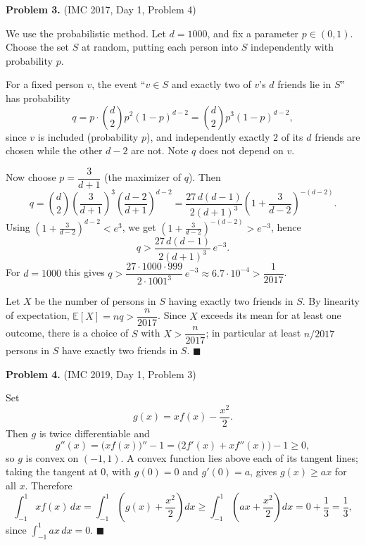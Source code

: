 \documentclass{article}
\newcommand{\E}{\mathbb{E}}
\begin{document}
\bigskip

\noindent\textbf{Problem 3.} (IMC 2017, Day 1, Problem 4)

\medskip
\noindent We use the probabilistic method. Let \( d = 1000 \), and fix a parameter \( p \in (0,1) \). Choose the set \( S \) at random, putting each person into \( S \) independently with probability \( p \).

For a fixed person \( v \), the event ``\( v \in S \) and exactly two of \( v \)'s \( d \) friends lie in \( S \)'' has probability
\[
q = p \cdot \binom{d}{2} p^2 (1-p)^{d-2} = \binom{d}{2} p^3 (1-p)^{d-2},
\]
since \( v \) is included (probability \( p \)), and independently exactly \( 2 \) of its \( d \) friends are chosen while the other \( d-2 \) are not. Note \( q \) does not depend on \( v \).

Now choose \( p = \dfrac{3}{d+1} \) (the maximizer of \( q \)). Then
\[
q = \binom{d}{2}\left(\frac{3}{d+1}\right)^{3}\left(\frac{d-2}{d+1}\right)^{d-2}
= \frac{27\,d(d-1)}{2(d+1)^3}\left(1 + \frac{3}{d-2}\right)^{-(d-2)}.
\]
Using \( \left(1 + \tfrac{3}{d-2}\right)^{d-2} < e^{3} \), we get \( \left(1 + \tfrac{3}{d-2}\right)^{-(d-2)} > e^{-3} \), hence
\[
q > \frac{27\,d(d-1)}{2(d+1)^3}\, e^{-3}.
\]
For \( d = 1000 \) this gives \( q > \dfrac{27\cdot 1000 \cdot 999}{2\cdot 1001^3}\, e^{-3} \approx 6.7\cdot 10^{-4} > \dfrac{1}{2017} \).

Let \( X \) be the number of persons in \( S \) having exactly two friends in \( S \). By linearity of expectation, \( \E[X] = n q > \dfrac{n}{2017} \). Since \( X \) exceeds its mean for at least one outcome, there is a choice of \( S \) with \( X > \dfrac{n}{2017} \); in particular at least \( n/2017 \) persons in \( S \) have exactly two friends in \( S \). \hfill\( \blacksquare \)

\bigskip

\noindent\textbf{Problem 4.} (IMC 2019, Day 1, Problem 3)

\medskip
\noindent Set
\[
g(x) = x f(x) - \frac{x^2}{2}.
\]
Then \( g \) is twice differentiable and
\[
g''(x) = \big( x f(x) \big)'' - 1 = \big( 2 f'(x) + x f''(x) \big) - 1 \geq 0,
\]
so \( g \) is convex on \( (-1,1) \). A convex function lies above each of its tangent lines; taking the tangent at \( 0 \), with \( g(0) = 0 \) and \( g'(0) = a \), gives \( g(x) \geq a x \) for all \( x \). Therefore
\[
\int_{-1}^{1} x f(x)\, dx = \int_{-1}^{1} \left( g(x) + \frac{x^2}{2} \right) dx \geq \int_{-1}^{1} \left( a x + \frac{x^2}{2} \right) dx = 0 + \frac{1}{3} = \frac{1}{3},
\]
since \( \int_{-1}^1 a x\, dx = 0 \). \hfill\( \blacksquare \)
\end{document}
